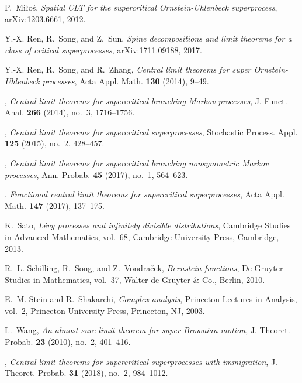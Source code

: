 \documentclass[12pt,a4paper]{amsart}
\theoremstyle{plain}
\theoremstyle{definition}
\numberwithin{equation}{section}
\begin{document}
\begin{thebibliography}{10}
P.~Mi{\l}o{\'s}, \emph{Spatial {CLT} for the supercritical
  {O}rnstein-{U}hlenbeck superprocess}, arXiv:1203.6661, 2012.

Y.-X. Ren, R.~Song, and Z.~Sun, \emph{Spine decompositions and limit theorems
  for a class of critical superprocesses}, arXiv:1711.09188, 2017.

Y.-X. Ren, R.~Song, and R.~Zhang, \emph{Central limit theorems for super
  {O}rnstein-{U}hlenbeck processes}, Acta Appl. Math. \textbf{130} (2014),
  9--49.

\bysame, \emph{Central limit theorems for supercritical branching {M}arkov
  processes}, J. Funct. Anal. \textbf{266} (2014), no.~3, 1716--1756.

\bysame, \emph{Central limit theorems for supercritical superprocesses},
  Stochastic Process. Appl. \textbf{125} (2015), no.~2, 428--457.

\bysame, \emph{Central limit theorems for supercritical branching nonsymmetric
  {M}arkov processes}, Ann. Probab. \textbf{45} (2017), no.~1, 564--623.

\bysame, \emph{Functional central limit theorems for supercritical
  superprocesses}, Acta Appl. Math. \textbf{147} (2017), 137--175.

K.~Sato, \emph{L{\'e}vy processes and infinitely divisible distributions},
  Cambridge Studies in Advanced Mathematics, vol.~68, Cambridge University
  Press, Cambridge, 2013.

R.~L. Schilling, R.~Song, and Z.~Vondra\v{c}ek, \emph{Bernstein functions}, De
  Gruyter Studies in Mathematics, vol.~37, Walter de Gruyter \& Co., Berlin,
  2010.

E.~M. Stein and R.~Shakarchi, \emph{Complex analysis}, Princeton Lectures in
  Analysis, vol.~2, Princeton University Press, Princeton, NJ, 2003.

L.~Wang, \emph{An almost sure limit theorem for super-{B}rownian motion}, J.
  Theoret. Probab. \textbf{23} (2010), no.~2, 401--416.

\bysame, \emph{Central limit theorems for supercritical superprocesses with
  immigration}, J. Theoret. Probab. \textbf{31} (2018), no.~2, 984--1012.

\end{thebibliography}
\end{document}

